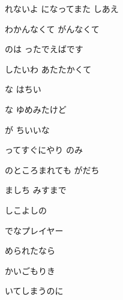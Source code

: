 \documentclass[a4paper,tate,twocolumn,12pt]{ltjtarticle}
\begin{document}
\begin{flushleft}
\begin{minipage}{\linewidth}
れないよ になってまた しあえ

わかんなくて がんなくて

のは ったでえばです
\end{minipage}

\vspace{2em}

\noindent\begin{minipage}{\linewidth}
したいわ あたたかくて

な はちい

な ゆめみたけど

が ちいいな
\end{minipage}

\vspace{3em}

\noindent\begin{minipage}{\linewidth}
ってすぐにやり のみ

のところまれても がだち

ましち みすまで

しこよしの
\end{minipage}

\vspace{2em}

\noindent\begin{minipage}{\linewidth}
でなプレイヤー

められたなら

かいごもりき

 いてしまうのに
\end{minipage}

\vspace{2em}


\end{flushleft}
\end{document}
